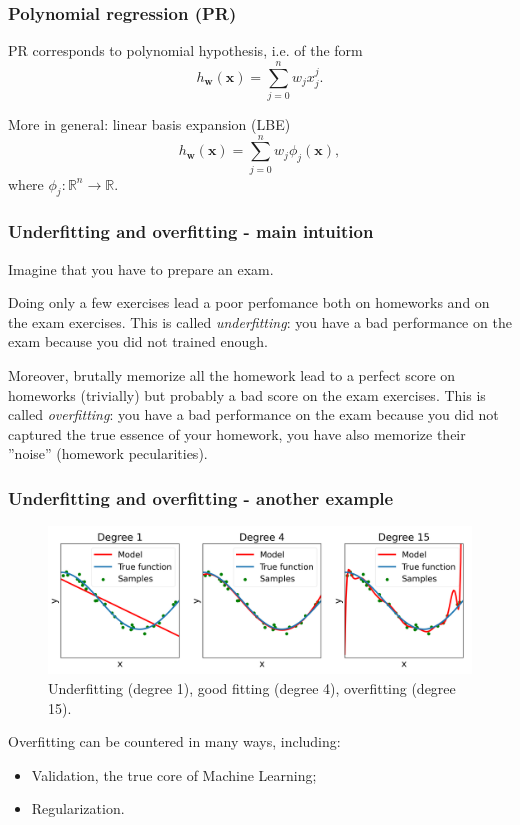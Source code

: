 \documentclass{beamer}
\begin{document}
	\begin{frame}
		\frametitle{Polynomial regression (PR)}
		PR corresponds to polynomial hypothesis, i.e. of the form
		\begin{equation*}
			h_{\bm{w}}(\bm{x}) = \sum_{j=0}^n w_j x^j_j.
		\end{equation*}
		
		\vspace{5mm}
		More in general: linear basis expansion (LBE)
		\begin{equation*}
			h_{\bm{w}}(\bm{x}) = \sum_{j=0}^n w_j \phi_j(\bm{x}),
		\end{equation*}
		where $\phi_j: \mathbb{R}^n \rightarrow \mathbb{R}$.
	\end{frame}

	\begin{frame}
		\frametitle{Underfitting and overfitting - main intuition}
		
		Imagine that you have to prepare an exam. 
		
		\vspace{5mm}
		
		Doing only a few exercises lead a poor perfomance both on homeworks and on the exam exercises. This is called \textsl{underfitting}: you have a bad performance on the exam because you did not trained enough.
		
		\vspace{5mm}
		
		Moreover, brutally memorize all the homework lead to a perfect score on homeworks (trivially) but probably a bad score on the exam exercises. This is called \textsl{overfitting}: you have a bad performance on the exam because you did not captured the true essence of your homework, you have also memorize their ''noise'' (homework pecularities).
	\end{frame}

	\begin{frame}
		\frametitle{Underfitting and overfitting - another example}
		\begin{figure}
			\centering
			\includegraphics[scale=0.35]{images/overfitting_poly}
			\caption{Underfitting (degree 1), good fitting (degree 4), overfitting (degree 15).}
		\end{figure}
	
	Overfitting can be countered in many ways, including:
	
	\begin{itemize}
		\item Validation, the true core of Machine Learning;
		\item Regularization.
	\end{itemize}
	\end{frame}
\end{document}
